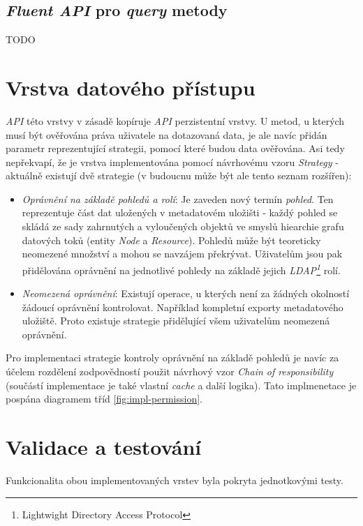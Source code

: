 \subsection{\textit{Fluent API} pro \textit{query} metody}
TODO


\section{Vrstva datového přístupu}
\textit{API} této vrstvy v zásadě kopíruje \textit{API} perzistentní vrstvy.  U metod, u kterých musí být ověřována práva uživatele na dotazovaná data, je ale navíc přidán parametr reprezentující strategii, pomocí které budou data ověřována. Asi tedy nepřekvapí, že je vrstva implementována pomocí návrhovému vzoru \textit{Strategy} - aktuálně existují dvě strategie (v budoucnu může být ale tento seznam rozšířen):

\begin{itemize}
   \item{\textit{Oprávnění na základě pohledů a rolí}}: Je zaveden nový termín \textit{pohled}. Ten reprezentuje část dat uložených v metadatovém uložišti - každý pohled se skládá ze sady zahrnutých a vyloučených objektů ve smyslů hiearchie grafu datových toků (entity \textit{Node} a \textit{Resource}). Pohledů může být teoreticky neomezené množství a mohou se navzájem překrývat. Uživatelům jsou pak přidělována oprávnění na jednotlivé pohledy na základě jejich \textit{LDAP\footnote{Lightwight Directory Access Protocol}} rolí.

   \item{\textit{Neomezená oprávnění}}: Existují operace, u kterých není za žádných okolností žádoucí oprávnění kontrolovat. Například kompletní exporty metadatového uložiště. Proto existuje strategie přidělující všem uživatelům neomezená oprávnění.
\end{itemize}

Pro implementaci strategie kontroly oprávnění na základě pohledů je navíc za účelem rozdělení zodpovědností použit návrhový vzor \textit{Chain of responsibility} (součástí implementace je také vlastní \textit{cache} a další logika). Tato implmenetace je pospána diagramem tříd \ref{fig:impl-permission}.


\section{Validace a testování}
Funkcionalita obou implementovaných vrstev byla pokryta jednotkovými testy. %

